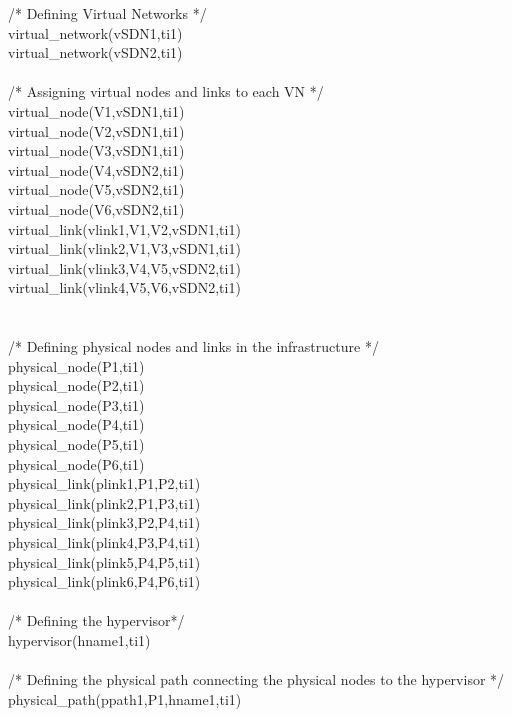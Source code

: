 \begin{myformula}
/* Defining Virtual Networks */\\
virtual\_network(vSDN1,ti1)\\
virtual\_network(vSDN2,ti1)\\
\textbf{\\}
/* Assigning virtual nodes and links to each VN */\\
virtual\_node(V1,vSDN1,ti1)\\
virtual\_node(V2,vSDN1,ti1)\\
virtual\_node(V3,vSDN1,ti1)\\
virtual\_node(V4,vSDN2,ti1)\\
virtual\_node(V5,vSDN2,ti1)\\
virtual\_node(V6,vSDN2,ti1)\\
virtual\_link(vlink1,V1,V2,vSDN1,ti1)\\
virtual\_link(vlink2,V1,V3,vSDN1,ti1)\\
virtual\_link(vlink3,V4,V5,vSDN2,ti1)\\
virtual\_link(vlink4,V5,V6,vSDN2,ti1)\\
\textbf{\\}
\textbf{\\}
/* Defining physical nodes and links in the infrastructure */\\
physical\_node(P1,ti1)\\
physical\_node(P2,ti1)\\
physical\_node(P3,ti1)\\
physical\_node(P4,ti1)\\
physical\_node(P5,ti1)\\
physical\_node(P6,ti1)\\
physical\_link(plink1,P1,P2,ti1)\\
physical\_link(plink2,P1,P3,ti1)\\
physical\_link(plink3,P2,P4,ti1)\\
physical\_link(plink4,P3,P4,ti1)\\
physical\_link(plink5,P4,P5,ti1)\\
physical\_link(plink6,P4,P6,ti1)\\
\textbf{\\}
/* Defining the hypervisor*/\\
hypervisor(hname1,ti1)\\
\textbf{\\}
/* Defining the physical path connecting the physical nodes to the hypervisor */\\
physical\_path(ppath1,P1,hname1,ti1)\\

\end{myformula}
